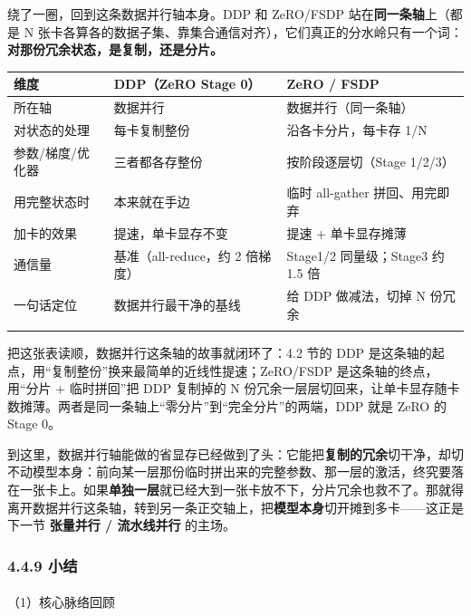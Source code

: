 \documentclass[
  chinese,
]{ctexart}
\makeatletter
\let\oldparagraph\paragraph
\renewcommand{\paragraph}{
    \@ifstar
      \xxxParagraphStar
      \xxxParagraphNoStar
  }
\newcommand{\xxxParagraphStar}[1]{\oldparagraph*{#1}\mbox{}}
\newcommand{\xxxParagraphNoStar}[1]{\oldparagraph{#1}\mbox{}}
\makeatother
\begin{document}
绕了一圈，回到这条数据并行轴本身。DDP 和 ZeRO/FSDP
站在\textbf{同一条轴}上（都是 N
张卡各算各的数据子集、靠集合通信对齐），它们真正的分水岭只有一个词：\textbf{对那份冗余状态，是复制，还是分片。}

\begin{center}
\begin{tabular}{@{}>{\raggedright\arraybackslash}p{} >{\raggedright\arraybackslash}p{} >{\raggedright\arraybackslash}p{}@{}}
\toprule\noalign{}
维度 & DDP（ZeRO Stage 0） & ZeRO / FSDP \\
\midrule\noalign{}
所在轴 & 数据并行 & 数据并行（同一条轴） \\
对状态的处理 & 每卡复制整份 & 沿各卡分片，每卡存 1/N \\
参数/梯度/优化器 & 三者都各存整份 & 按阶段逐层切（Stage 1/2/3） \\
用完整状态时 & 本来就在手边 & 临时 all-gather 拼回、用完即弃 \\
加卡的效果 & 提速，单卡显存不变 & 提速 + 单卡显存摊薄 \\
通信量 & 基准（all-reduce，约 2 倍梯度） & Stage1/2 同量级；Stage3 约 1.5 倍 \\
一句话定位 & 数据并行最干净的基线 & 给 DDP 做减法，切掉 N 份冗余 \\
\bottomrule\noalign{}
\end{tabular}
\end{center}

把这张表读顺，数据并行这条轴的故事就闭环了：4.2 节的 DDP
是这条轴的起点，用``复制整份''换来最简单的近线性提速；ZeRO/FSDP
是这条轴的终点，用``分片 + 临时拼回''把 DDP 复制掉的 N
份冗余一层层切回来，让单卡显存随卡数摊薄。两者是同一条轴上``零分片''到``完全分片''的两端，DDP
就是 ZeRO 的 Stage 0。

到这里，数据并行轴能做的省显存已经做到了头：它能把\textbf{复制的冗余}切干净，却切不动模型本身：前向某一层那份临时拼出来的完整参数、那一层的激活，终究要落在一张卡上。如果\textbf{单独一层}就已经大到一张卡放不下，分片冗余也救不了。那就得离开数据并行这条轴，转到另一条正交轴上，把\textbf{模型本身}切开摊到多卡------这正是下一节
\textbf{张量并行 / 流水线并行} 的主场。

\subsubsection{4.4.9 小结}\label{ux5c0fux7ed3-3}

\paragraph{（1）核心脉络回顾}\label{ux6838ux5fc3ux8109ux7edcux56deux987e-3}
\end{document}
